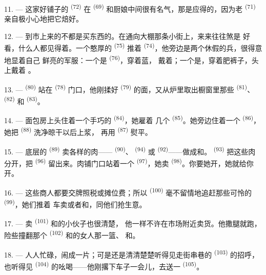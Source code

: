 11. --- 这家好铺子的 \textsuperscript{(72)} 在
\textsuperscript{(69)} 和厨娘中间很有名气，那是应得的，因为老
\textsuperscript{(71)} 亲自极小心地把它焙好。

\VUsaut{4.0mm}
\VUsaut{3.0mm}

12. --- 到市上来的不都是买东西的。在通向大棚那条小街上，来来往往煞是
好看，什么人都见得着。一个憨厚的 \textsuperscript{(75)} 推着
 \textsuperscript{(74)}，他旁边是两个休假的兵，很得意地显着自己
鲜亮的军服：一个是 \textsuperscript{(76)}，穿着蓝，
戴着；一个是，穿着肥裤子，头上戴着
。

13. ---  \textsuperscript{(80)} 站在 \textsuperscript{(78)}
门口，他刚揉好 \textsuperscript{(79)} 的面，又从炉里取出橱窗里那些
 \textsuperscript{(81)}、 \textsuperscript{(82)} 和
 \textsuperscript{(83)}。

14. --- 面包房上头住着一个手巧的 \textsuperscript{(84)}，她雇着
几个 \textsuperscript{(85)}。她旁边住着一个
\textsuperscript{(86)}，她把 \textsuperscript{(88)} 洗净晾干以后上浆，
再用 \textsuperscript{(87)} 熨平。

\VUsaut{4.0mm}
\VUsaut{3.0mm}

15. --- 底层的 \textsuperscript{(89)} 卖各样的肉——
\textsuperscript{(90)}、 \textsuperscript{(94)} 或
\textsuperscript{(92)}——做成和。
 \textsuperscript{(93)} 把这些肉分开，把
\textsuperscript{(96)} 留出来。肉铺门口站着一个
\textsuperscript{(97)}，她卖 \textsuperscript{(98)}。你要她开，她就给你
开。

16. --- 这些商人都要交牌照税或摊位费；所以 \textsuperscript{(100)}
毫不留情地追赶那些可怜的 \textsuperscript{(99)}，她们推着
车卖或者和，同他们抢生意。

\VUsaut{4.0mm}
\VUsaut{3.0mm}

17. --- 卖 \textsuperscript{(101)} 和的小伙子也很清楚，
他一样不许在市场附近卖货。他撒腿就跑，险些撞翻那个
\textsuperscript{(102)} 和的女人那一篮、
和。

18. --- 人人忙碌，闹成一片；可是还是清清楚楚听得见走街串巷的
 \textsuperscript{(103)} 的招呼，也听得见
\textsuperscript{(104)} 的吆喝——他刚撂下车子一会儿，去送一
\textsuperscript{(105)}。
\VUsaut{6.0mm}
\VUfilet{22mm}
